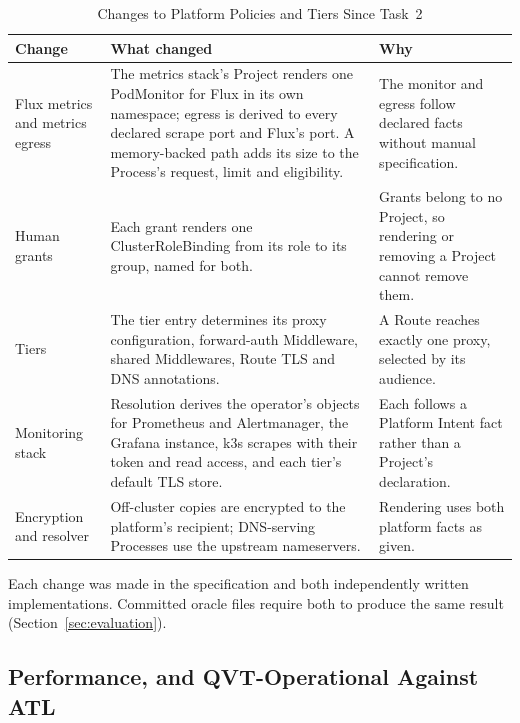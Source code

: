 \begin{table}[!htbp]
\centering
\footnotesize
\begin{tabular}{>{\raggedright\arraybackslash}p{}>{\raggedright\arraybackslash}p{}>{\raggedright\arraybackslash}p{}}
\hline
\textbf{Change} & \textbf{What changed} & \textbf{Why} \\
\hline
Flux metrics and metrics egress & The metrics stack's Project renders one PodMonitor for Flux in its own namespace; egress is derived to every declared scrape port and Flux's port. A memory-backed path adds its size to the Process's request, limit and eligibility. & The monitor and egress follow declared facts without manual specification. \\
Human grants & Each grant renders one ClusterRoleBinding from its role to its group, named for both. & Grants belong to no Project, so rendering or removing a Project cannot remove them. \\
Tiers & The tier entry determines its proxy configuration, forward-auth Middleware, shared Middlewares, Route TLS and DNS annotations. & A Route reaches exactly one proxy, selected by its audience. \\
Monitoring stack & Resolution derives the operator's objects for Prometheus and Alertmanager, the Grafana instance, k3s scrapes with their token and read access, and each tier's default TLS store. & Each follows a Platform Intent fact rather than a Project's declaration. \\
Encryption and resolver & Off-cluster copies are encrypted to the platform's recipient; DNS-serving Processes use the upstream nameservers. & Rendering uses both platform facts as given. \\
\hline
\end{tabular}
\caption{Changes to Platform Policies and Tiers Since Task~2}
\label{tab:app-transform-5}
\end{table}

Each change was made in the specification and both independently written
implementations. Committed oracle files require both to produce the same
result (Section~\ref{sec:evaluation}).

\subsection{Performance, and QVT-Operational Against ATL}
\label{sec:appendix-performance}

